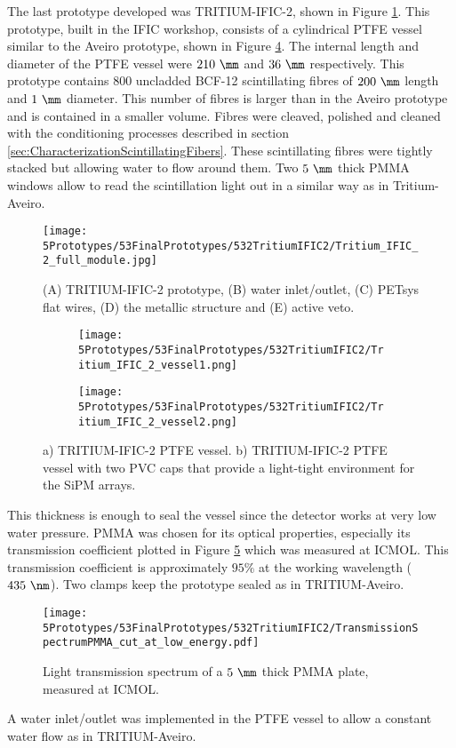The last prototype developed was TRITIUM-IFIC-2, shown in Figure \ref{fig:TritiumIFIC2}. This prototype, built in the IFIC workshop, consists of a cylindrical PTFE vessel similar to the Aveiro prototype, shown in Figure \ref{fig:Tritium-IFIC2_vessels}. The internal length and diameter of the PTFE vessel were $210~\mm$ and $36~\mm$ respectively. This prototype contains $800$ uncladded BCF-12 scintillating fibres of $200~\mm$ length and $1~\mm$ diameter. This number of fibres is larger than in the Aveiro prototype and is contained in a smaller volume. Fibres were cleaved, polished and cleaned with the conditioning processes described in section \ref{sec:CharacterizationScintillatingFibers}. These scintillating fibres were tightly stacked but allowing water to flow around them. Two $5~\mm$ thick PMMA windows allow to read the scintillation light out in a similar way as in Tritium-Aveiro. 
\begin{figure}[h]
\centering
\texttt{[image: 5Prototypes/53FinalPrototypes/532TritiumIFIC2/Tritium\_IFIC\_2\_full\_module.jpg]}
\caption{(A) TRITIUM-IFIC-2 prototype, (B) water inlet/outlet, (C) PETsys flat wires, (D) the metallic structure and (E) active veto.\label{fig:TritiumIFIC2}}
\end{figure}
\begin{figure}
\centering
    \begin{subfigure}[b]{0.35\textwidth}
    \centering
    \texttt{[image: 5Prototypes/53FinalPrototypes/532TritiumIFIC2/Tritium\_IFIC\_2\_vessel1.png]}  
    \caption{\label{subfig:Tritium_IFIC_2_vessel}}
    \end{subfigure}
    \hfill
    \begin{subfigure}[b]{0.3\textwidth}
    \centering
    \texttt{[image: 5Prototypes/53FinalPrototypes/532TritiumIFIC2/Tritium\_IFIC\_2\_vessel2.png]}  
    \caption{\label{subfig:TritiumIFIC2_vessel_with_PVC_caps}}
    \end{subfigure}
 \caption{a) TRITIUM-IFIC-2 PTFE vessel. b) TRITIUM-IFIC-2 PTFE vessel with two PVC caps that provide a light-tight environment for the SiPM arrays.}
 \label{fig:Tritium-IFIC2_vessels}
\end{figure}
This thickness is enough to seal the vessel since the detector works at very low water pressure. PMMA was chosen for its optical properties, especially its transmission coefficient plotted in Figure \ref{fig:PMMATransmissionSpectrum} which was measured at ICMOL. This transmission coefficient is approximately $95\%$ at the working wavelength ($435~\nm$). Two clamps keep the prototype sealed as in TRITIUM-Aveiro.
\begin{figure}[h]
\centering
\texttt{[image: 5Prototypes/53FinalPrototypes/532TritiumIFIC2/TransmissionSpectrumPMMA\_cut\_at\_low\_energy.pdf]}
\caption{Light transmission spectrum of a $5~\mm$ thick PMMA plate, measured at ICMOL. \label{fig:PMMATransmissionSpectrum}}
\end{figure}	
A water inlet/outlet was implemented in the PTFE vessel to allow a constant water flow as in TRITIUM-Aveiro. 

